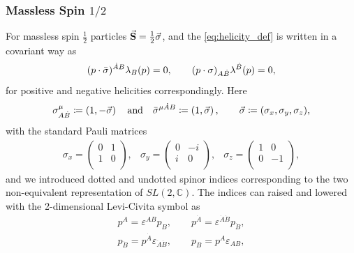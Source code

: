 \subsubsection{Massless Spin $1/2$}

For massless spin $\frac{1}{2}$ particles $\va{S} = \frac{1}{2}\va{\sigma}$, and 
the \cref{eq:helicity_def} is written in a covariant way as
\begin{equation}
  (\sp(p,\bar{\sigma}))^{\dot{A}B} \lambda_B(p) = 0, \qquad (\sp(p,\sigma))_{A\dot{B}} \lambda^{\dot{B}}(p) = 0,
\end{equation}
for positive and negative helicities correspondingly.
Here 
\begin{equation}
  \sigma_{A \dot{B}}^{\mu} \coloneqq  \left( 1 , - \vec{\sigma} \right) \qand \bar{\sigma}^{\mu \dot{A} B} \coloneqq  \left( 1 ,  \vec{\sigma} \right),
  \qquad \vec{\sigma}\coloneqq (\sigma_x,\sigma_y,\sigma_z),
\end{equation} 
with the standard Pauli matrices
\begin{eqnarray}
  \sigma_x = \left(\begin{array}{cc}
    0 & 1\\
    1 & 0 \\
  \end{array} \right),
  &
  \sigma_y = \left(\begin{array}{cc}
    0 & -i\\
    i & 0 \\
  \end{array} \right),
  &
  \sigma_z = \left(\begin{array}{cc}
    1 & 0\\
    0 & -1 \\
  \end{array} \right),
\end{eqnarray}
and we introduced dotted and undotted spinor indices corresponding to the two non-equivalent representation of $SL(2,\mathbb{C})$.
The indices can raised and lowered with the 2-dimensional Levi-Civita symbol as
\begin{equation}
    \label{raising_and_lowering_spinor_indices}
  \begin{gathered}
    p^A = \varepsilon^{AB} p_B, \qquad
    p^{\dot{A}} = \varepsilon^{\dot{A}\dot{B}} p_{\dot{B}}, \\
    p_{\dot{B}} = p^{\dot{A}} \varepsilon_{\dot{A}\dot{B}},  \qquad
    p_B = p^A \varepsilon_{AB},
  \end{gathered}
\end{equation}
